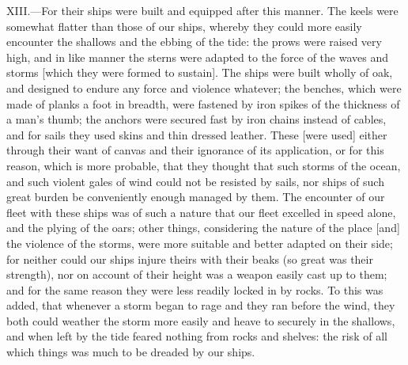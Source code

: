 XIII.—For their ships were built and equipped after this manner. The
keels were somewhat flatter than those of our ships, whereby they could
more easily encounter the shallows and the ebbing of the tide: the prows
were raised very high, and in like manner the sterns were adapted to the
force of the waves and storms [which they were formed to sustain]. The
ships were built wholly of oak, and designed to endure any force and
violence whatever; the benches, which were made of planks a foot in
breadth, were fastened by iron spikes of the thickness of a man's thumb;
the anchors were secured fast by iron chains instead of cables, and for
sails they used skins and thin dressed leather. These [were used] either
through their want of canvas and their ignorance of its application, or
for this reason, which is more probable, that they thought that such
storms of the ocean, and such violent gales of wind could not be
resisted by sails, nor ships of such great burden be conveniently enough
managed by them. The encounter of our fleet with these ships was of such
a nature that our fleet excelled in speed alone, and the plying of the
oars; other things, considering the nature of the place [and] the
violence of the storms, were more suitable and better adapted on their
side; for neither could our ships injure theirs with their beaks (so
great was their strength), nor on account of their height was a weapon
easily cast up to them; and for the same reason they were less readily
locked in by rocks. To this was added, that whenever a storm began to
rage and they ran before the wind, they both could weather the storm
more easily and heave to securely in the shallows, and when left by the
tide feared nothing from rocks and shelves: the risk of all which things
was much to be dreaded by our ships.

